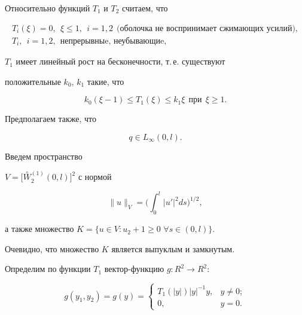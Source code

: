 Относительно функций $T_1$ и $T_2$ считаем, что


\begin{gather}


T_i(\xi)=0, \ \ \xi \leq 1, \ \ i=1, 2


\ \ \text{(оболочка не воспринимает сжимающих усилий)},


\label{shelBZB8s} \\


%


T_i, \ \ i=1, 2, \ \ \text{непрерывныe, неубывающиe},


\label{shelBZB8v}


\end{gather}


$T_1$ имеет линейный рост на бесконечности, т.\,е. существуют


положительные $k_{0}$, $k_{1}$ такие, что


\begin{equation}


k_{0} (\xi-1) \leq T_1(\xi) \leq k_{1} \xi


\ \ \text{при} \ \ \xi \geq 1.


\label{shelBZB8t}


\end{equation}


Предполагаем также, что


\begin{equation}


q \in L_{\infty} (0,l).


\label{shelBZB8q}


\end{equation}


Введем пространство


$V=\big[\overset{\circ}{W}{}^{(1)}_2 (0, l)\big]^2$ с нормой


$$


\| u \|_V=\bigg({\int_{0}^{l} | u' |^2 ds}


\bigg)^{1/2},


$$


а также множество $K =\{u \in V : u_2+1 \geq 0$ $\forall s \in (0, l)\}$.


Очевидно, что множество $K$ является выпуклым и замкнутым.





Определим по функции $T_{1}$ вектор-функцию $g : R^{2} \to R^{2}$:


\begin{equation*}


g(y_1,y_2)=g(y) =


\begin{cases}


{T_{1}(| y |) | y |^{-1} y,} & {y \neq 0;} \\


{0,} & {y=0}.


\end{cases}




\end{equation*}


